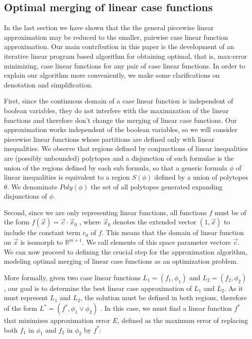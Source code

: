 \subsection{ Optimal merging of linear case functions}

In the last section we have shown that the the general piecewise linear approximation may be reduced to the smaller, pairwise case linear function approximation. Our main contribution in this paper is the development of an iterative linear program based algorithm for obtaining optimal, that is, max-error minimizing, case linear functions for any pair of case linear functions. In order to explain our algorithm more conveniently, we make some clarifications on denotation and simplification.

First, since the continuous domain of a case linear function is independent of boolean variables, they do not interfere with the maximization of the linear functions and therefore don't change the merging of linear case functions. Our approximation works independent of the boolean variables, so we will consider piecewise linear functions whose partitions are defined only with linear inequalities. We observe that regions defined by conjunctions of linear inequalities are (possibly unbounded) polytopes and a disjunction of such formulae is the union of the  regions defined by each sub formula, so that a generic formula $\phi$ of linear inequalities is equivalent to a region  $S(\phi)$ defined by a union of polytopes $\theta$. We denominate $Poly(\phi)$ the set of all polytopes generated expanding disjunctions of $\phi$.

Second, since we are only representing linear functions, all functions $f$ must be of the form 
$f(\vec{x}) = \vec{c}\cdot \vec{x}_0$ , where $\vec{x}_0$ denotes the extended vector 
$(1,\vec{x})$ to include the constant term $c_0$ of $f$. This means that the domain of linear function on $\vec{x}$ is isomorph to $\mathbb{R}^{m+1}$. We call elements of this space parameter vectors $\vec{c}$.
We can now proceed to defining the crucial step for the approximation algorithm, modeling optimal merging of linear case functions as an optimization problem.

More formally, given two case linear functions $L_1 = ( f_1, \phi_1 )$ and $L_2 = ( f_2, \phi_2 )$, our goal is to determine the best linear case approximation of $L_1$ and $L_2$. As it must represent  $L_1$ and $L_2$, the solution must be defined in both regions, therefore of the form $L^* = (f^*,\phi_1 \lor  \phi_2)$ . In this case, we must find a linear function $f^*$ that minimizes approximation error $E$, defined as the maximum  error of replacing both $f_1$ in $\phi_1$ and $f_2$ in $\phi_2$ by $f^*$:

